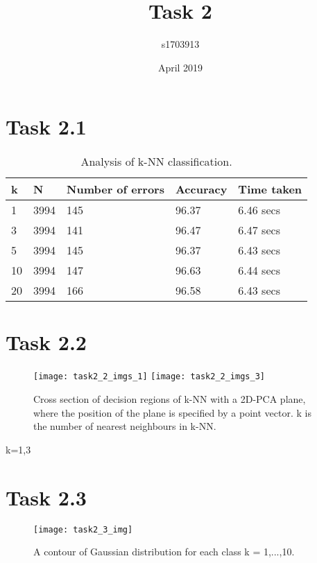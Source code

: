 \documentclass[12pt]{extarticle}
\title{Task 2}
\author{s1703913}
\date{April 2019}
\begin{document}
\maketitle
\pagebreak

\section{Task 2.1}
\begin{table}[h!]
\centering
\caption{Analysis of k-NN classification.}
\begin{tabular}{ |p{3cm}|p{3cm}|p{3cm}|p{3cm}|p{3cm}|  }
 \hline
 k&N&Number of errors&Accuracy&Time taken\\
 \hline
 1&3994&145&96.37&6.46 secs\\
 3&3994&141&96.47&6.47 secs\\
 5&3994&145&96.37&6.43 secs\\
 10&3994&147&96.63&6.44 secs\\
 20&3994&166&96.58&6.43 secs\\
 \hline
\end{tabular}
\end{table}

\section{Task 2.2}
\begin{figure}[h!]
\caption{Cross section of decision regions of k-NN with a 2D-PCA plane, where the position of the plane is specified by a point vector. k is the number of nearest neighbours in k-NN.}
\centering
\texttt{[image: task2\_2\_imgs\_1]}
\texttt{[image: task2\_2\_imgs\_3]}
\end{figure}
\begin{center}
 k=1,3
\end{center}
\pagebreak

\section{Task 2.3}
\begin{figure}[h!]
\caption{A contour of Gaussian distribution for each class k = 1,...,10.}
\centering
\texttt{[image: task2\_3\_img]}
\end{figure}
\pagebreak
\end{document}
